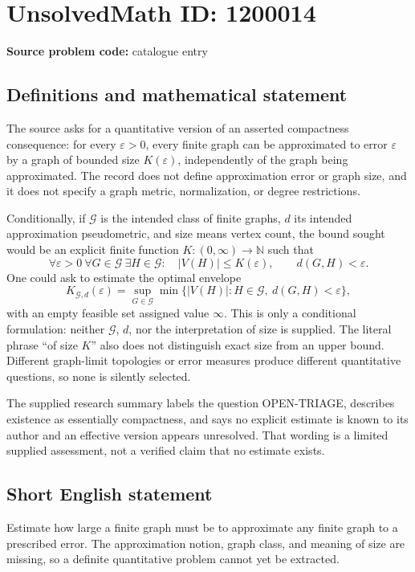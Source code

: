 \documentclass[11pt]{article}
\newcommand{\N}{\mathbb{N}}
\begin{document}
\section*{UnsolvedMath ID: 1200014}
\textbf{Source problem code:} catalogue entry
\subsection{Definitions and mathematical statement}
The source asks for a quantitative version of an asserted compactness consequence: for every \(\varepsilon>0\), every finite graph can be approximated to error \(\varepsilon\) by a graph of bounded size \(K(\varepsilon)\), independently of the graph being approximated. The record does not define approximation error or graph size, and it does not specify a graph metric, normalization, or degree restrictions.

Conditionally, if \(\mathcal G\) is the intended class of finite graphs, \(d\) its intended approximation pseudometric, and size means vertex count, the bound sought would be an explicit finite function \(K:(0,\infty)\to\N\) such that
\[
\forall\varepsilon>0\ \forall G\in\mathcal G\ \exists H\in\mathcal G:
\quad |V(H)|\le K(\varepsilon),\qquad d(G,H)<\varepsilon.
\]
One could ask to estimate the optimal envelope
\[
K_{\mathcal G,d}(\varepsilon)=
\sup_{G\in\mathcal G}\min\{|V(H)|:H\in\mathcal G,\ d(G,H)<\varepsilon\},
\]
with an empty feasible set assigned value \(\infty\). This is only a conditional formulation: neither \(\mathcal G\), \(d\), nor the interpretation of size is supplied. The literal phrase ``of size \(K\)'' also does not distinguish exact size from an upper bound. Different graph-limit topologies or error measures produce different quantitative questions, so none is silently selected.

The supplied research summary labels the question OPEN-TRIAGE, describes existence as essentially compactness, and says no explicit estimate is known to its author and an effective version appears unresolved. That wording is a limited supplied assessment, not a verified claim that no estimate exists.
\subsection{Short English statement}
Estimate how large a finite graph must be to approximate any finite graph to a prescribed error. The approximation notion, graph class, and meaning of size are missing, so a definite quantitative problem cannot yet be extracted.
\end{document}
